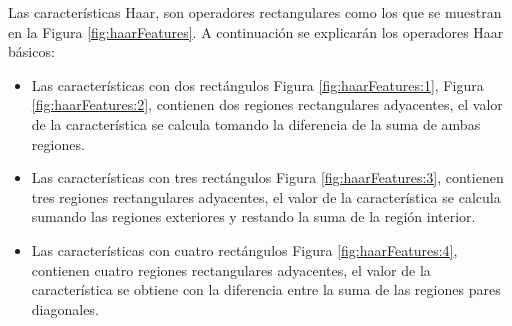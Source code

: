Las características Haar, son operadores rectangulares como los que se muestran en la Figura \ref{fig:haarFeatures}. A continuación se explicarán los operadores Haar básicos:
\begin{itemize}
\item Las características con dos rectángulos Figura \ref{fig:haarFeatures:1}, Figura \ref{fig:haarFeatures:2}, contienen dos regiones rectangulares adyacentes, el valor de la característica se calcula tomando la diferencia de la suma de ambas regiones. 

\item Las características con tres rectángulos Figura \ref{fig:haarFeatures:3}, contienen tres regiones rectangulares adyacentes, el valor de la característica se calcula sumando las regiones exteriores y restando la suma de la región interior.

\item Las características con cuatro rectángulos Figura \ref{fig:haarFeatures:4}, contienen cuatro regiones rectangulares adyacentes, el valor de la característica se obtiene con la diferencia entre la suma de las regiones pares diagonales.
\end{itemize} 

